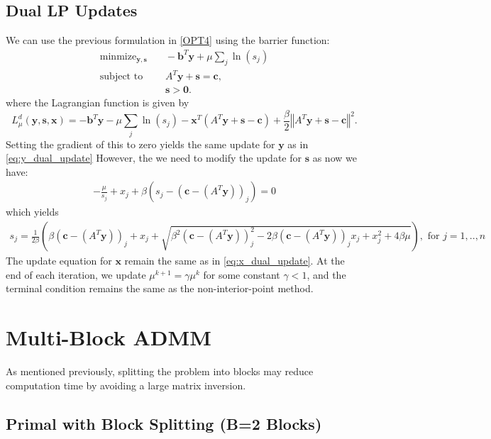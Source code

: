 \documentclass{article}
\begin{document}
\subsection*{Dual LP Updates}
We can use the previous formulation in \eqref{OPT4} using the barrier function:
\begin{align}
\text{minmize}_{\mathbf{y}, \mathbf{s}} &\quad -\mathbf{b}^T\mathbf{y} + \mu \sum_j \ln (s_j)  \tag{OPT6}\label{OPT6} \\
\text{subject to } &\quad  A^T \mathbf{y}  + \mathbf{s} = \mathbf{c},  \nonumber \\
&\quad \mathbf{s} > \mathbf{0} \nonumber.
\end{align}
where the Lagrangian function is given by
\[
L_{\mu}^{d}(\mathbf{y},\mathbf{s},\mathbf{x})=-\mathbf{b}^{T}\mathbf{y}-\mu\sum_{j}\ln\left(s_{j}\right)-\mathbf{x}^{T}\left(A^{T}\mathbf{y}+\mathbf{s}-\mathbf{c}\right)+\frac{\beta}{2}\left\Vert A^{T}\mathbf{y}+\mathbf{s}-\mathbf{c}\right\Vert ^{2}.
\]
Setting the gradient of this to zero yields the same update for $\mathbf{y}$ as in \eqref{eq:y_dual_update} 
However, the we need to modify the update for $\mathbf{s}$ as now we have:
\begin{align}
- \frac{\mu}{s_j} + x_j  + \beta \left(s_j - (\mathbf{c} - (A^T \mathbf{y}))_j\right)= 0
\end{align}
which yields 
\begin{align}
s_j = \frac{1}{2\beta}\left(\beta (\mathbf{c} - (A^T \mathbf{y}))_j + x_j  + \sqrt{\beta^2 (\mathbf{c} - (A^T \mathbf{y}))_j^2 - 2\beta (\mathbf{c} - (A^T \mathbf{y}))_j x_{j} + x_j^2 + 4\beta\mu } \right), \text{ for $j = 1,..,n$}
\end{align}
The update equation for $\mathbf{x}$ remain the same as in \eqref{eq:x_dual_update}. At the end of each iteration, we update $\mu^{k+1} = \gamma \mu^k$ for some constant $\gamma<1$, and the terminal condition remains the same as the non-interior-point method.



\vspace{0.5in}
\section{Multi-Block ADMM}

As mentioned previously, splitting the problem into blocks may reduce computation time by avoiding a large matrix inversion.

{\color{red} \subsection*{Primal with Block Splitting (B=2 Blocks)}}
\end{document}

